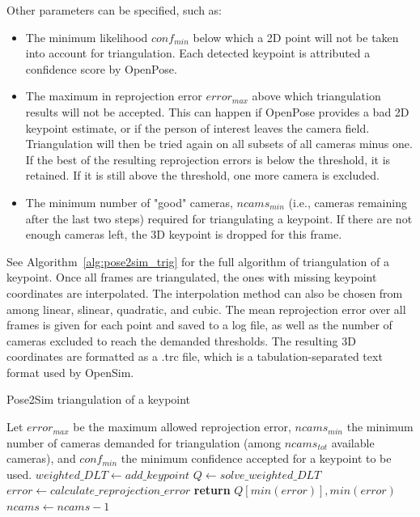 Other parameters can be specified, such as:
\begin{itemize}[itemsep=0em, topsep=0em, leftmargin=*]
      \item The minimum likelihood \(conf_{min}\) below which a 2D point will not be taken into account for triangulation. Each detected keypoint is attributed a confidence score by OpenPose.
      \item The maximum in reprojection error \(error_{max}\) above which triangulation results will not be accepted. This can happen if OpenPose provides a bad 2D keypoint estimate, or if the person of interest leaves the camera field. Triangulation will then be tried again on all subsets of all cameras minus one. If the best of the resulting reprojection errors is below the threshold, it is retained. If it is still above the threshold, one more camera is excluded.
      \item The minimum number of "good" cameras, \(ncams_{min}\) (i.e., cameras remaining after the last two steps) required for triangulating a keypoint. If there are not enough cameras left, the 3D keypoint is dropped for this frame.
\end{itemize}

See Algorithm~\ref{alg:pose2sim_trig} for the full algorithm of triangulation of a keypoint. Once all frames are triangulated, the ones with missing keypoint coordinates are interpolated. The interpolation method can also be chosen from among linear, slinear, quadratic, and cubic. The mean reprojection error over all frames is given for each point and saved to a log file, as well as the number of cameras excluded to reach the demanded thresholds. The resulting 3D coordinates are formatted as a .trc file, which is a tabulation-separated text format used by OpenSim.

\begin{algorithm}[!ht]
      \caption{Pose2Sim triangulation of a keypoint}\label{alg:pose2sim_trig}
      \begin{algorithmic}[0]
            \STATE Let $error_{max}$ be the maximum allowed reprojection error, $ncams_{min}$ the minimum number of cameras demanded for triangulation (among $ncams_{tot}$ available cameras), and $conf_{min}$ the minimum confidence accepted for a keypoint to be used.
                              \STATE $weighted\_DLT \gets add\_keypoint$
                        \ENDIF
                      \ENDFOR
                    \STATE $Q \gets solve\_weighted\_DLT$
                    \STATE $error \gets calculate\_reprojection\_error$
                \ENDFOR
                    \STATE \textbf{return} $Q[min(error)], min(error)$
                \ELSE 
                    \STATE $ncams \gets ncams-1$
                \ENDIF                
            \ENDWHILE
      \end{algorithmic}
\end{algorithm}


